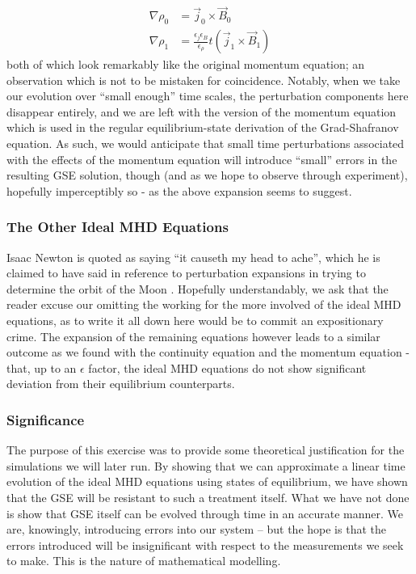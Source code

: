 \begin{align*}
    \nabla \rho_0 &= \vec{j}_0 \times \vec{B}_0 \\
    \nabla \rho_1 &= \frac{\epsilon_j \epsilon_B}{\epsilon_\rho} t (\vec{j}_1 \times \vec{B}_1) 
\end{align*}
both of which look remarkably like the original momentum equation; an observation which is not to be mistaken for coincidence. Notably, when we take our 
evolution over ``small enough'' time scales, the perturbation components here disappear entirely, and we are left with the version of the 
momentum equation which is used in the regular equilibrium-state derivation of the Grad-Shafranov equation. As such, we would anticipate that 
small time perturbations associated with the effects of the momentum equation will introduce ``small'' errors in the resulting GSE solution, though 
(and as we hope to observe through experiment), hopefully imperceptibly so - as the above expansion seems to suggest.  

\subsubsection{The Other Ideal MHD Equations}
Isaac Newton is quoted as saying ``it causeth my head to ache'', which he is claimed to have said in reference to perturbation expansions 
in trying to determine the orbit of the Moon \cite{newton-headache}. Hopefully understandably, we ask that the reader excuse our omitting the working for the more involved of the ideal MHD equations, 
as to write it all down here would be to commit an expositionary crime. The expansion of the remaining equations however leads to a similar outcome 
as we found with the continuity equation and the momentum equation - that, up to an $\epsilon$ factor, the ideal MHD equations do not show significant deviation 
from their equilibrium counterparts. 

\subsubsection{Significance}
The purpose of this exercise was to provide some theoretical justification for the simulations we will later run. By showing that we can 
approximate a linear time evolution of the ideal MHD equations using states of equilibrium, we have shown that the GSE will be resistant 
to such a treatment itself. What we have not done is show that GSE itself can be evolved through time in an accurate manner. We are, knowingly, 
introducing errors into our system -- but the hope is that the errors introduced will be insignificant with respect to the measurements we seek to make. 
This is the nature of mathematical modelling.

